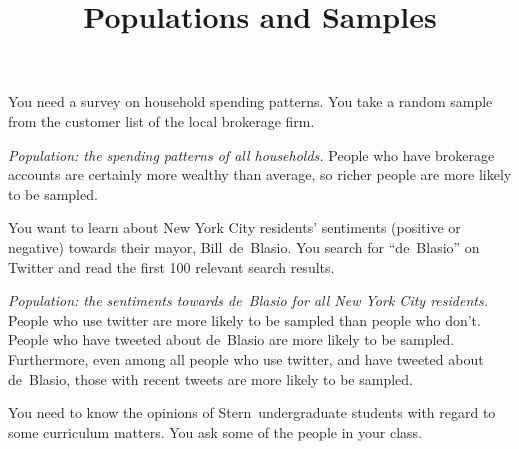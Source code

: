 \documentclass[answers,11pt]{exam}
\title{Populations  and Samples}
\begin{document}
\begin{questions}



\question You need a survey on household spending patterns.  You take a random
sample from the customer list of the local brokerage firm.

\begin{solution}
\textit{Population: the spending patterns of all households.}
People who have brokerage accounts are certainly more wealthy
than average, so richer people are more likely to be sampled.
\end{solution}




\question You want to learn about New York City residents' sentiments (positive
or negative) towards their mayor, Bill~de~Blasio.  You search for
``de~Blasio'' on Twitter and read the first 100 relevant search results.

\begin{solution}
\textit{Population: the sentiments towards de~Blasio for all New York City
residents.}   People who use twitter are more likely to be sampled than people
who don't.  People who have tweeted about de~Blasio are more likely to be
sampled.  Furthermore, even among all people who use twitter, and have tweeted about
de~Blasio, those with recent tweets are more likely to be sampled.
\end{solution}


\question You need to know the opinions of Stern~undergraduate students with regard to
some curriculum matters.  You ask some of the people in your class.


\end{questions}
\end{document}
